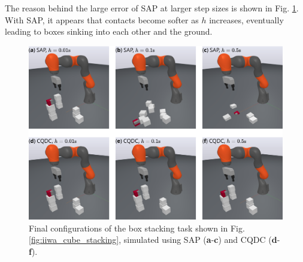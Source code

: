 The reason behind the large error of SAP at larger step sizes is shown in Fig. \ref{fig:iiwa_cube_stacking_sap_vs_cqdc}. With SAP, it appears that contacts become softer as $h$ increases, eventually leading to boxes sinking into each other and the ground. 
\begin{figure}
\centering
\includegraphics[width=1.0\linewidth]{figures/02_quasi_static_dynamics/sap_vs_cqdc.png}
\caption{Final configurations of the box stacking task shown in Fig. \ref{fig:iiwa_cube_stacking}, simulated using SAP (\textbf{a}-\textbf{c}) and CQDC (\textbf{d}-\textbf{f}).}
\label{fig:iiwa_cube_stacking_sap_vs_cqdc}
\vspace{-0.5cm}
\end{figure}

